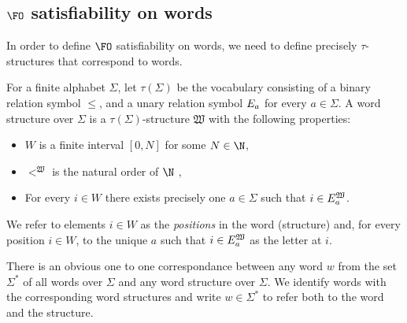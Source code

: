 \subsection{$\FO$ satisfiability on words}


In order to define $\FO$ satisfiability on words, we need to define precisely $\tau$-structures that correspond to words. 

For a finite alphabet $\Sigma$,
 let $\tau (\Sigma )$ be the vocabulary consisting of a binary relation
symbol $\leq$, 
and a unary
relation symbol $E_a$ for every $a \in \Sigma$. 
A word structure over $\Sigma$ is a 
$\tau (\Sigma )$-structure $\mathfrak{W}$ with
the following properties:

	\begin{itemize}
	\item $W$ is a finite interval $[0,N]$ for some $ N \in \N$, 
	\item $<^\mathfrak{W}$ is the natural order of $\N$%
,
	\item For every $i \in W$ there exists precisely one $a \in \Sigma$ such that $i \in 
	E_a^\mathfrak{W}$.
	\end{itemize}

We refer to elements $i \in W$ as the {\em positions} in the word (structure) and, for every position $i \in W$, to the unique $a$ such that $i \in E_a^\mathfrak{W}$ as the letter at $i$.


There is an obvious one to one correspondance between any word $w$ from the set $\Sigma^*$ of all words over $\Sigma$ and any word structure over $\Sigma$.
We identify words with the corresponding word structures
and write $w \in \Sigma^*$ to refer both to the word and the structure.


